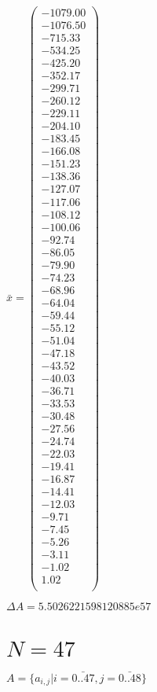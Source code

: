 \documentclass[a4paper,12pt]{article}
\begin{document}
$\bar { x } = \begin{pmatrix}
-1079.00 \\
-1076.50 \\
-715.33 \\
-534.25 \\
-425.20 \\
-352.17 \\
-299.71 \\
-260.12 \\
-229.11 \\
-204.10 \\
-183.45 \\
-166.08 \\
-151.23 \\
-138.36 \\
-127.07 \\
-117.06 \\
-108.12 \\
-100.06 \\
-92.74 \\
-86.05 \\
-79.90 \\
-74.23 \\
-68.96 \\
-64.04 \\
-59.44 \\
-55.12 \\
-51.04 \\
-47.18 \\
-43.52 \\
-40.03 \\
-36.71 \\
-33.53 \\
-30.48 \\
-27.56 \\
-24.74 \\
-22.03 \\
-19.41 \\
-16.87 \\
-14.41 \\
-12.03 \\
-9.71 \\
-7.45 \\
-5.26 \\
-3.11 \\
-1.02 \\
1.02 \\
\end{pmatrix}
$

$\Delta A = 5.5026221598120885e57$



\section{ $N = 47$ }
$A = \{ a _{ i, j } | i = \bar { 0..47 }, j = \bar { 0..48 } \}$
\end{document}

